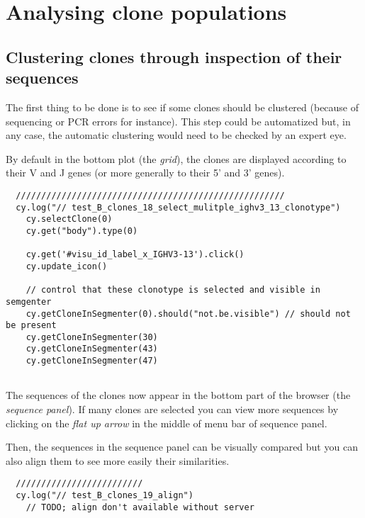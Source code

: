 \section{Analysing clone populations}

\subsection{Clustering clones through inspection of their sequences}

The first thing to be done is to see if some clones should be clustered (because
of sequencing or PCR errors for instance). This step could be automatized
but, in any case, the automatic clustering would need to be checked by an expert
eye.

By default in the bottom plot (the \textit{grid}), the clones
  are displayed according to their V and J genes (or more generally to their
  5' and 3' genes). 

\begin{verbatim}
  /////////////////////////////////////////////////////
  cy.log("// test_B_clones_18_select_mulitple_ighv3_13_clonotype")
    cy.selectClone(0)
    cy.get("body").type(0)

    cy.get('#visu_id_label_x_IGHV3-13').click()
    cy.update_icon()

    // control that these clonotype is selected and visible in semgenter
    cy.getCloneInSegmenter(0).should("not.be.visible") // should not be present
    cy.getCloneInSegmenter(30)
    cy.getCloneInSegmenter(43)
    cy.getCloneInSegmenter(47)


\end{verbatim}

The sequences of the clones now appear in the bottom part of the browser (the
\textit{sequence panel}). If many clones are selected you can view more sequences
by clicking on the \textit{flat up arrow} in the middle of menu bar of sequence panel.
 
Then, the sequences in the sequence panel can be visually compared but you can also align
them to see more easily their similarities.


\begin{verbatim}
  /////////////////////////
  cy.log("// test_B_clones_19_align")
    // TODO; align don't available without server


\end{verbatim}

